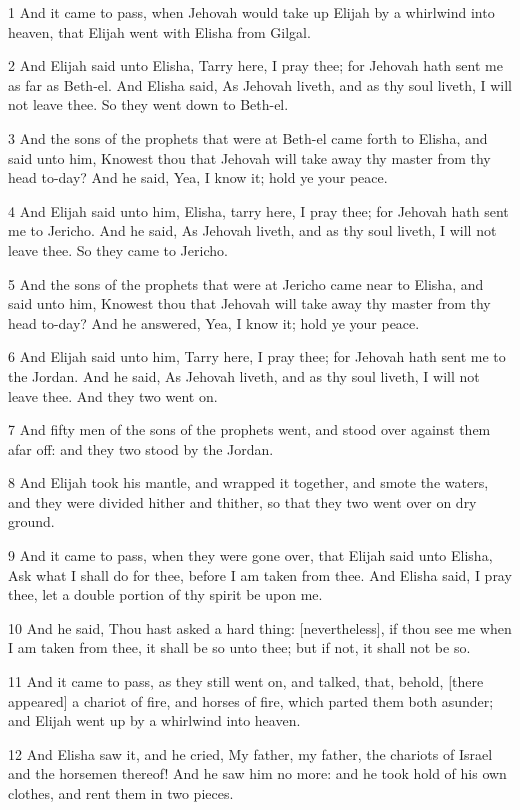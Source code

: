 \par 1 And it came to pass, when Jehovah would take up Elijah by a whirlwind into heaven, that Elijah went with Elisha from Gilgal.
\par 2 And Elijah said unto Elisha, Tarry here, I pray thee; for Jehovah hath sent me as far as Beth-el. And Elisha said, As Jehovah liveth, and as thy soul liveth, I will not leave thee. So they went down to Beth-el.
\par 3 And the sons of the prophets that were at Beth-el came forth to Elisha, and said unto him, Knowest thou that Jehovah will take away thy master from thy head to-day? And he said, Yea, I know it; hold ye your peace.
\par 4 And Elijah said unto him, Elisha, tarry here, I pray thee; for Jehovah hath sent me to Jericho. And he said, As Jehovah liveth, and as thy soul liveth, I will not leave thee. So they came to Jericho.
\par 5 And the sons of the prophets that were at Jericho came near to Elisha, and said unto him, Knowest thou that Jehovah will take away thy master from thy head to-day? And he answered, Yea, I know it; hold ye your peace.
\par 6 And Elijah said unto him, Tarry here, I pray thee; for Jehovah hath sent me to the Jordan. And he said, As Jehovah liveth, and as thy soul liveth, I will not leave thee. And they two went on.
\par 7 And fifty men of the sons of the prophets went, and stood over against them afar off: and they two stood by the Jordan.
\par 8 And Elijah took his mantle, and wrapped it together, and smote the waters, and they were divided hither and thither, so that they two went over on dry ground.
\par 9 And it came to pass, when they were gone over, that Elijah said unto Elisha, Ask what I shall do for thee, before I am taken from thee. And Elisha said, I pray thee, let a double portion of thy spirit be upon me.
\par 10 And he said, Thou hast asked a hard thing: [nevertheless], if thou see me when I am taken from thee, it shall be so unto thee; but if not, it shall not be so.
\par 11 And it came to pass, as they still went on, and talked, that, behold, [there appeared] a chariot of fire, and horses of fire, which parted them both asunder; and Elijah went up by a whirlwind into heaven.
\par 12 And Elisha saw it, and he cried, My father, my father, the chariots of Israel and the horsemen thereof! And he saw him no more: and he took hold of his own clothes, and rent them in two pieces.
